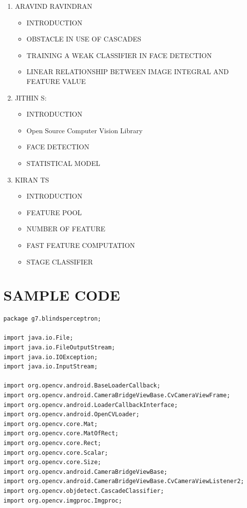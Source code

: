 \documentclass[11pt,a4paper,twoside]{report}
\begin{document}
\begin{appendix}
\begin{enumerate}
\begin{itemize}
\end{itemize}
\newpage
\item ARAVIND RAVINDRAN
\begin{itemize}
\item INTRODUCTION
\item	OBSTACLE IN USE OF CASCADES
\item	TRAINING A WEAK CLASSIFIER IN FACE DETECTION
\item	LINEAR RELATIONSHIP BETWEEN IMAGE INTEGRAL AND FEATURE VALUE

\end{itemize}
\item JITHIN S:
\begin{itemize}
\item INTRODUCTION
\item Open Source Computer Vision Library
\item FACE DETECTION 
\item STATISTICAL MODEL

\end{itemize}
\item KIRAN TS
\begin{itemize}
\item INTRODUCTION
\item FEATURE POOL
\item NUMBER OF FEATURE
\item FAST FEATURE COMPUTATION
\item STAGE CLASSIFIER

\end{itemize}

\end{enumerate}

\section{SAMPLE CODE}
\begin{tiny}
\begin{flushleft}
\begin{lstlisting}
package g7.blindsperceptron;

import java.io.File;
import java.io.FileOutputStream;
import java.io.IOException;
import java.io.InputStream;

import org.opencv.android.BaseLoaderCallback;
import org.opencv.android.CameraBridgeViewBase.CvCameraViewFrame;
import org.opencv.android.LoaderCallbackInterface;
import org.opencv.android.OpenCVLoader;
import org.opencv.core.Mat;
import org.opencv.core.MatOfRect;
import org.opencv.core.Rect;
import org.opencv.core.Scalar;
import org.opencv.core.Size;
import org.opencv.android.CameraBridgeViewBase;
import org.opencv.android.CameraBridgeViewBase.CvCameraViewListener2;
import org.opencv.objdetect.CascadeClassifier;
import org.opencv.imgproc.Imgproc;


\end{lstlisting}
\end{flushleft}
\end{tiny}
\end{appendix}
\end{document}
